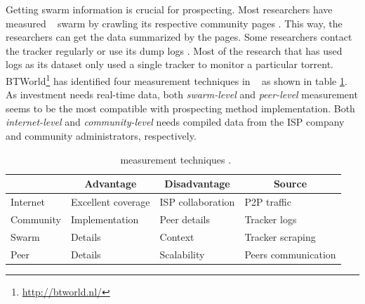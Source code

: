 Getting swarm information is crucial for prospecting. Most researchers have measured \bt~ swarm by crawling its respective community pages \cite{2013:survivepriv:jia, 2005:bittorrentcooperation:andrade, 2014:userbehaviourprivate:jia, 2010:pubpriv:meulpolder, 2014:sustainabilitytorrent:chen, 2012:economicbt:kash, 2013:investmentcm:capota, 2009:demandsupplyres:andrade, 2011:interswarm:capota}. This way, the researchers can get the data summarized by the pages. Some researchers contact the tracker regularly or use its dump logs \cite{2011:yoshida:crawlbtnet, 2005:bittorrentcooperation:andrade,  2015:freeriderinbtcommunity:das, 2011:interswarm:capota}. Most of the research that has used logs as its dataset only used a single tracker to monitor a particular torrent. BTWorld\footnote{\url{http://btworld.nl/}} has identified four measurement techniques in \bt~\cite{2010:btworld:wojciechowski} as shown in table \ref{tbl:btmeasuremethod}. As investment needs real-time data, both \textit{swarm-level} and \textit{peer-level} measurement seems to be the most compatible with prospecting method implementation. Both \textit{internet-level} and \textit{community-level} needs compiled data from the ISP company and community administrators, respectively.


\begin{table}[ht]
	\centering
	\caption{\bt~measurement techniques \cite{2010:btworld:wojciechowski}.}
	\label{tbl:btmeasuremethod}
	\begin{tabular}{|l|l|l|l|}
		\hline
		\rowcolor[HTML]{C0C0C0} 
		\multicolumn{1}{|c|}{\cellcolor[HTML]{C0C0C0}\textbf{Level}} & \multicolumn{1}{c|}{\cellcolor[HTML]{C0C0C0}\textbf{Advantage}} & \multicolumn{1}{c|}{\cellcolor[HTML]{C0C0C0}\textbf{Disadvantage}} & 
		\multicolumn{1}{c|}{\cellcolor[HTML]{C0C0C0}\textbf{Source}}\\ \hline
		Internet & Excellent coverage & ISP collaboration & P2P traffic \\ \hline
		Community & Implementation & Peer details & Tracker logs \\ \hline
		Swarm & Details & Context & Tracker scraping \\ \hline
		Peer & Details & Scalability & Peers communication \\ \hline
	\end{tabular}
\end{table}

